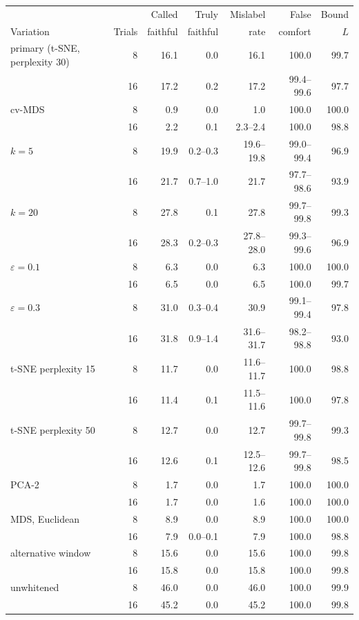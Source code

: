 \begin{tabular}{lrrrrrr}
\toprule
 & & Called & Truly & Mislabel & False & Bound \\
Variation & Trials & faithful & faithful & rate & comfort & $L$ \\
\midrule
primary (t-SNE, perplexity 30) & 8 & 16.1 & 0.0 & 16.1 & 100.0 & 99.7 \\
 & 16 & 17.2 & 0.2 & 17.2 & 99.4--99.6 & 97.7 \\
\addlinespace
cv-MDS & 8 & 0.9 & 0.0 & 1.0 & 100.0 & 100.0 \\
 & 16 & 2.2 & 0.1 & 2.3--2.4 & 100.0 & 98.8 \\
\addlinespace
$k=5$ & 8 & 19.9 & 0.2--0.3 & 19.6--19.8 & 99.0--99.4 & 96.9 \\
 & 16 & 21.7 & 0.7--1.0 & 21.7 & 97.7--98.6 & 93.9 \\
\addlinespace
$k=20$ & 8 & 27.8 & 0.1 & 27.8 & 99.7--99.8 & 99.3 \\
 & 16 & 28.3 & 0.2--0.3 & 27.8--28.0 & 99.3--99.6 & 96.9 \\
\addlinespace
$\varepsilon=0.1$ & 8 & 6.3 & 0.0 & 6.3 & 100.0 & 100.0 \\
 & 16 & 6.5 & 0.0 & 6.5 & 100.0 & 99.7 \\
\addlinespace
$\varepsilon=0.3$ & 8 & 31.0 & 0.3--0.4 & 30.9 & 99.1--99.4 & 97.8 \\
 & 16 & 31.8 & 0.9--1.4 & 31.6--31.7 & 98.2--98.8 & 93.0 \\
\addlinespace
t-SNE perplexity 15 & 8 & 11.7 & 0.0 & 11.6--11.7 & 100.0 & 98.8 \\
 & 16 & 11.4 & 0.1 & 11.5--11.6 & 100.0 & 97.8 \\
\addlinespace
t-SNE perplexity 50 & 8 & 12.7 & 0.0 & 12.7 & 99.7--99.8 & 99.3 \\
 & 16 & 12.6 & 0.1 & 12.5--12.6 & 99.7--99.8 & 98.5 \\
\addlinespace
PCA-2 & 8 & 1.7 & 0.0 & 1.7 & 100.0 & 100.0 \\
 & 16 & 1.7 & 0.0 & 1.6 & 100.0 & 100.0 \\
\addlinespace
MDS, Euclidean & 8 & 8.9 & 0.0 & 8.9 & 100.0 & 100.0 \\
 & 16 & 7.9 & 0.0--0.1 & 7.9 & 100.0 & 98.8 \\
\addlinespace
alternative window & 8 & 15.6 & 0.0 & 15.6 & 100.0 & 99.8 \\
 & 16 & 15.8 & 0.0 & 15.8 & 100.0 & 99.8 \\
\addlinespace
unwhitened & 8 & 46.0 & 0.0 & 46.0 & 100.0 & 99.9 \\
 & 16 & 45.2 & 0.0 & 45.2 & 100.0 & 99.8 \\
\bottomrule
\end{tabular}
